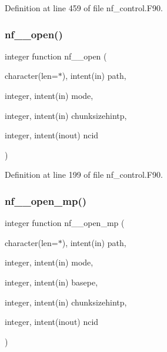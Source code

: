 Definition at line 459 of file nf\+\_\+control.\+F90.

\mbox{\label{nf__control_8F90_adf0af06bfd3b20b314cf7e4dbe6dae54}} 
\subsubsection{\texorpdfstring{nf\+\_\+\+\_\+open()}{nf\_\_open()}}
{\footnotesize\ttfamily integer function nf\+\_\+\+\_\+open (\begin{DoxyParamCaption}\item[{character(len=$\ast$), intent(in)}]{path,  }\item[{integer, intent(in)}]{mode,  }\item[{integer, intent(in)}]{chunksizehintp,  }\item[{integer, intent(inout)}]{ncid }\end{DoxyParamCaption})}



Definition at line 199 of file nf\+\_\+control.\+F90.

\mbox{\label{nf__control_8F90_ae3cabb48fc1ab9d5e41f51def78eaa93}} 
\subsubsection{\texorpdfstring{nf\+\_\+\+\_\+open\+\_\+mp()}{nf\_\_open\_mp()}}
{\footnotesize\ttfamily integer function nf\+\_\+\+\_\+open\+\_\+mp (\begin{DoxyParamCaption}\item[{character(len=$\ast$), intent(in)}]{path,  }\item[{integer, intent(in)}]{mode,  }\item[{integer, intent(in)}]{basepe,  }\item[{integer, intent(in)}]{chunksizehintp,  }\item[{integer, intent(inout)}]{ncid }\end{DoxyParamCaption})}



